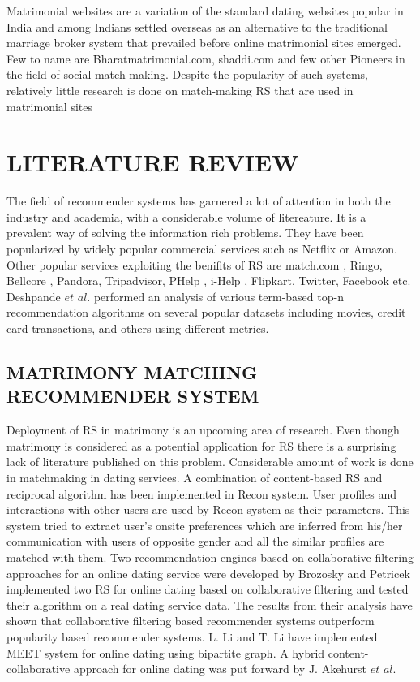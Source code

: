 \documentclass[12pt,oneside]{book}
\begin{document}
 Matrimonial websites are a variation of the standard dating websites popular in India and among Indians settled overseas as an alternative to the traditional marriage broker system that prevailed before online matrimonial sites emerged. Few to name are Bharatmatrimonial.com, shaddi.com and few other Pioneers in the field of social match-making. Despite the popularity of such systems,   relatively little research is done on match-making RS that are used in matrimonial sites
\section{LITERATURE REVIEW}
 The field of recommender systems has garnered a lot of attention in both the industry and academia, with a considerable volume of litereature\cite{4}. It is a prevalent way of solving the information rich problems. They have been popularized by widely popular commercial services such as Netflix\cite{5} or Amazon\cite{6}. Other popular services exploiting the benifits of RS are match.com \cite{7}, Ringo\cite{8}, Bellcore \cite{8}, Pandora, Tripadvisor, PHelp \cite{7}, i-Help \cite{7}, Flipkart, Twitter, Facebook etc. Deshpande $et$ $al$. \cite{9} performed an analysis of various term-based top-n recommendation algorithms on several popular datasets including movies, credit card transactions, and others using different metrics.
\subsection{MATRIMONY MATCHING RECOMMENDER SYSTEM}
Deployment of RS in matrimony is an upcoming area of research. Even though matrimony is considered as a potential application for RS there is a surprising lack of literature published on this problem. Considerable amount of work is done in matchmaking in dating services. A combination of content-based RS and reciprocal algorithm has been implemented in Recon \cite{7} system. User profiles and interactions with other users are used by Recon system as their parameters. This system tried to extract user's onsite preferences which are inferred from his/her communication with users of opposite gender and all the similar profiles are matched with them. Two recommendation engines based on collaborative filtering approaches for an online dating service were developed by Brozosky and Petricek\cite{10} implemented two RS for online dating based on collaborative filtering and tested their algorithm on a real dating service data. The results from their analysis have shown that collaborative filtering based recommender systems outperform popularity based recommender systems. L. Li and T. Li have implemented MEET \cite{11} system for online dating using bipartite graph. A hybrid content-collaborative approach \cite{12} for online dating was put forward by J. Akehurst $et$ $al$.
\end{document}
